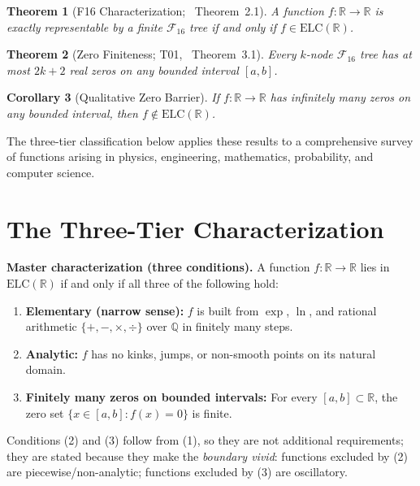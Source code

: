 \documentclass[12pt,a4paper]{article}
\newtheorem{theorem}{Theorem}[section]
\newtheorem{corollary}[theorem]{Corollary}
\theoremstyle{definition}
\newcommand{\ELC}{\mathrm{ELC}(\mathbb{R})}
\newcommand{\R}{\mathbb{R}}
\newcommand{\Q}{\mathbb{Q}}
\newcommand{\F}{\mathcal{F}_{16}}
\begin{document}
\begin{theorem}[F16 Characterization; \cite{F16}~Theorem~2.1]
\label{thm:f16}
A function $f:\R\to\R$ is exactly representable by a finite $\F$ tree
if and only if $f\in\ELC$.
\end{theorem}

\begin{theorem}[Zero Finiteness; T01, \cite{F16}~Theorem~3.1]
\label{thm:t01}
Every $k$-node $\F$ tree has at most $2k+2$ real zeros on any bounded
interval $[a,b]$.
\end{theorem}

\begin{corollary}[Qualitative Zero Barrier]
\label{cor:zeros}
If $f:\R\to\R$ has infinitely many zeros on any bounded interval,
then $f\notin\ELC$.
\end{corollary}

The three-tier classification below applies these results to a comprehensive
survey of functions arising in physics, engineering, mathematics, probability,
and computer science.

\section{The Three-Tier Characterization}
\label{sec:characterization}

\begin{mdframed}
\textbf{Master characterization (three conditions).}
A function $f:\R\to\R$ lies in $\ELC$ if and only if all three of
the following hold:
\begin{enumerate}[label=(\arabic*)]
  \item \textbf{Elementary (narrow sense):}
        $f$ is built from $\exp$, $\ln$, and rational arithmetic
        $\{+,-,\times,\div\}$ over $\Q$ in finitely many steps.
  \item \textbf{Analytic:}
        $f$ has no kinks, jumps, or non-smooth points on its natural domain.
  \item \textbf{Finitely many zeros on bounded intervals:}
        For every $[a,b]\subset\R$, the zero set $\{x\in[a,b]: f(x)=0\}$
        is finite.
\end{enumerate}
Conditions (2) and (3) follow from (1), so they are not additional requirements;
they are stated because they make the \emph{boundary vivid}:
functions excluded by (2) are piecewise/non-analytic;
functions excluded by (3) are oscillatory.
\end{mdframed}
\end{document}
